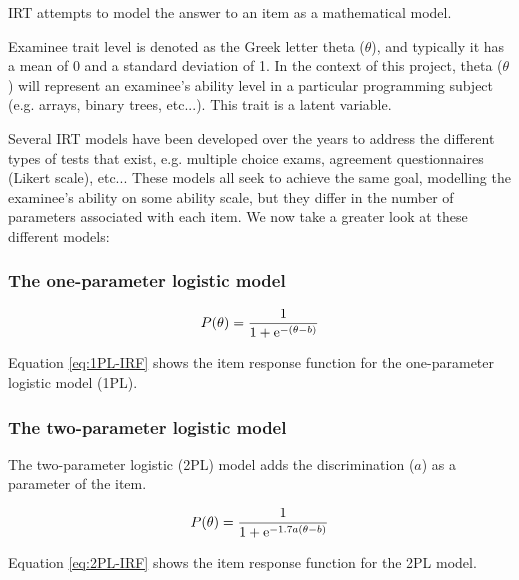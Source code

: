 IRT attempts to model the answer to an item as a mathematical model. \newline

Examinee trait level is denoted as the Greek letter theta ($\theta$), and typically it has a mean of 0 and a standard deviation of 1. In the context of this project, theta ($\theta$) will represent an examinee's ability level in a particular programming subject (e.g. arrays, binary trees, etc...). This trait is a latent variable.

%
%


Several IRT models have been developed over the years to address the different types of tests that exist, e.g. multiple choice exams, agreement questionnaires (Likert scale), etc... These models all seek to achieve the same goal, modelling the examinee's ability on some ability scale, but they differ in the number of parameters associated with each item. We now take a greater look at these different models:

\subsubsection{The one-parameter logistic model}
\begin{equation} \label{eq:1PL-IRF}
P(\theta) = \frac{1}{1 + \mathrm{e}^{-(\theta - b)}}
\end{equation}

Equation \eqref{eq:1PL-IRF} shows the item response function for the one-parameter logistic model (1PL). 

\subsubsection{The two-parameter logistic model}
The two-parameter logistic (2PL) model adds the discrimination ($a$) as a parameter of the item.

\begin{equation} \label{eq:2PL-IRF}
P(\theta) = \frac{1}{1 + \mathrm{e}^{-1.7a(\theta - b)}}
\end{equation}

Equation \eqref{eq:2PL-IRF} shows the item response function for the 2PL model. 

